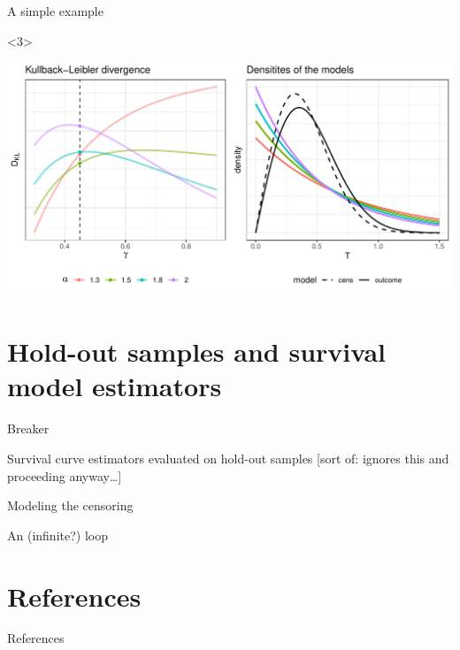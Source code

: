 \documentclass[smaller]{beamer}\usepackage{listings}
\begin{document}
\begin{frame}[label={sec:org635026f}]{A simple example}
\begin{onlyenv}<3>
\begin{center}
\includegraphics[width=.9\linewidth]{fig-mix-const-v2.pdf}
\end{center}
\end{onlyenv}
\end{frame}

\section{Hold-out samples and survival model estimators}
\label{sec:orgabd8c50}

\begin{frame}[label={sec:orgf346bc9}]{}
\begin{block}{\center Breaker}
\end{block}
\end{frame}


\begin{frame}[label={sec:org623d904}]{Survival curve estimators evaluated on hold-out samples}
[sort of: ignores this and proceeding anyway\ldots{}]
\end{frame}
\begin{frame}[label={sec:orgfb49f9a}]{Modeling the censoring}
\end{frame}
\begin{frame}[label={sec:org0054009}]{An (infinite?) loop}
\end{frame}

\section*{References}
\label{sec:org8ef4ed5}
\begin{frame}[label={sec:orga0f07ec}]{References}
\footnotesize 
\end{frame}
\end{document}
